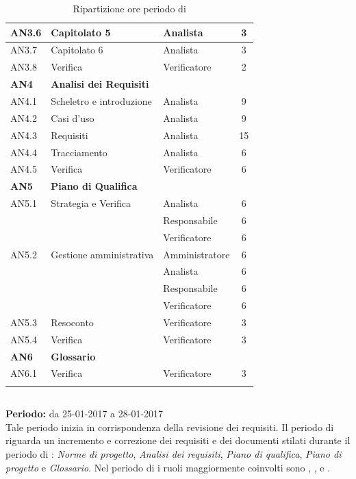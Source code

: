 \begin{longtable}{|l|l|l|c|}
      	{AN3.6} & {Capitolato 5} & Analista  & 3 \\
      	\hline
      	{AN3.7} & {Capitolato 6} & Analista  & 3 \\
      	\hline
      	{AN3.8} & {Verifica} & Verificatore  & 2 \\
      \hline
      \textbf{AN4} & \textbf{Analisi dei Requisiti} & &  \\
         \hline
         {AN4.1} & {Scheletro e introduzione} & Analista  &  9\\
         \hline
         {AN4.2} & {Casi d'uso} & Analista  &  9\\
         \hline
         {AN4.3} & {Requisiti} & Analista  &  15\\
         \hline
         {AN4.4} & {Tracciamento} & Analista  &  6\\
         \hline
         {AN4.5} & {Verifica} & Verificatore  & 6\\
     \hline
     \textbf{AN5} & \textbf{Piano di Qualifica} & &  \\
         \hline
         {AN5.1} & {Strategia e Verifica} & Analista &  6 \\
         & & Responsabile & 6\\
         & & Verificatore & 6\\
         \hline
         {AN5.2} & {Gestione amministrativa} & Amministratore & 6\\
         & & Analista & 6\\
         & & Responsabile & 6\\
         & & Verificatore & 6\\
         \hline
         {AN5.3} & {Resoconto} & Verificatore &  3\\
         \hline
         {AN5.4} & {Verifica} & Verificatore &  3 \\
     \hline
     \textbf{AN6} & \textbf{Glossario} & &  \\
         \hline
         {AN6.1} & {Verifica} & Verificatore &  3 \\
         \hline
  
     \caption{Ripartizione ore periodo di \AR{}}
\end{longtable}
\egroup
  
\subsection{\AD{}}
\textbf{Periodo:} da 25-01-2017 a 28-01-2017 \\
Tale periodo inizia in corrispondenza della revisione dei requisiti. Il periodo di \AD{} riguarda un incremento e correzione dei requisiti e dei documenti stilati durante il periodo di \AR{}: \textit{Norme di progetto}, \textit{Analisi dei requisiti}, \textit{Piano di qualifica}, \textit{Piano di progetto} e \textit{Glossario}.
Nel periodo di \AD{} i ruoli maggiormente coinvolti sono \Analista{}, \Responsabile{}, \Amministratore{} e \Verificatore{}.

